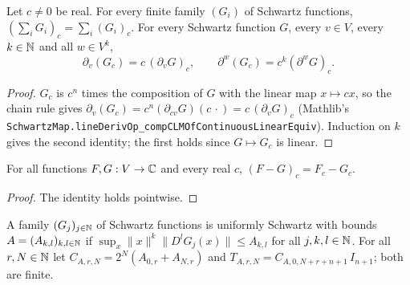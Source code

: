 \begin{lemma}
\label{lem:derivative-dilate}
\leanok
{}
Let $c \neq 0$ be real. For every finite family $(G_i)$ of Schwartz functions,
$(\sum_i G_i)_c = \sum_i (G_i)_c$. For every Schwartz function $G$, every $v \in V$, every
$k \in \mathbb{N}$ and all $w \in V^k$,
\[
  \partial_v (G_c) = c \, (\partial_v G)_c , \qquad \partial^w (G_c) = c^k (\partial^w G)_c .
\]
\end{lemma}

\begin{proof}
\leanok
$G_c$ is $c^n$ times the composition of $G$ with the linear map $x \mapsto c x$, so the chain rule
gives $\partial_v (G_c) = c^n (\partial_{c v} G)(c \, \cdot) = c \, (\partial_v G)_c$ (Mathlib's
\texttt{SchwartzMap.\allowbreak lineDerivOp\_\allowbreak compCLMOfContinuousLinearEquiv}).
Induction on $k$ gives the second identity; the first holds since $G \mapsto G_c$ is linear.
\end{proof}

\begin{lemma}
\label{lem:dilate-sub-l1}
\leanok
{}
For all functions $F, G : V \to \mathbb{C}$ and every real $c$, $(F - G)_c = F_c - G_c$.
\end{lemma}

\begin{proof}
\leanok
The identity holds pointwise.
\end{proof}

\begin{definition}
\label{def:uniform-schwartz}
\leanok
{}
A family $(G_j)_{j \in \mathbb{N}}$ of Schwartz functions is uniformly Schwartz with bounds
$A = (A_{k,l})_{k, l \in \mathbb{N}}$ if $\sup_x \|x\|^k \|D^l G_j(x)\| \leq A_{k,l}$ for all
$j, k, l \in \mathbb{N}$. For all $r, N \in \mathbb{N}$ let $C_{A,r,N} = 2^N (A_{0,r} + A_{N,r})$ and
$T_{A,r,N} = C_{A,0,N+r+n+1} \, I_{n+1}$; both are finite.
\end{definition}

